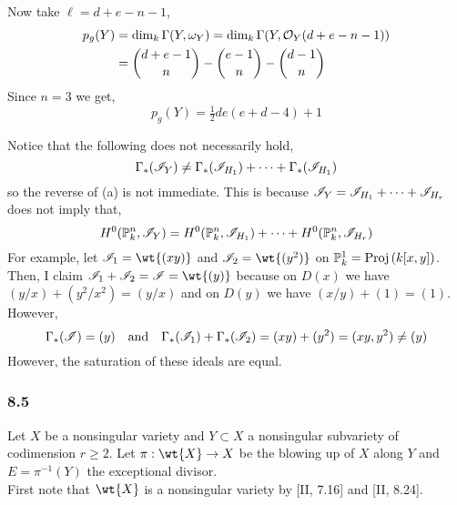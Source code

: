\documentclass[12pt]{article}
\begin{document}
\begin{enumerate}
\begin{center}
\end{center}
Now take $\ell = d + e - n - 1$,
\begin{align*}
p_g(Y) & = \dim_k \Gamma(Y, \omega_Y) = \dim_k \Gamma(Y, \mathcal{O}_{Y}(d + e - n - 1)) 
\\
& = {d + e - 1 \choose n } - { e - 1 \choose n } - { d - 1 \choose n } 
\end{align*} 
Since $n = 3$ we get,
\[ p_g(Y) = \tfrac{1}{2} de (e + d - 4) + 1 \]
\end{enumerate}

\begin{rmk}
Notice that the following does not necessarily hold,
\[ \Gamma_*(\mathscr{I}_Y) \neq \Gamma_*(\mathscr{I}_{H_1}) + \cdots + \Gamma_*(\mathscr{I}_{H_1}) \]
so the reverse of (a) is not immediate. This is because $\mathscr{I}_Y = \mathscr{I}_{H_1} + \cdots + \mathscr{I}_{H_r}$ does not imply that,
\[ H^0(\mathbb{P}^n_k, \mathscr{I}_Y) = H^0(\mathbb{P}^n_k,\mathscr{I}_{H_1}) + \cdots + H^0(\mathbb{P}^n_k,\mathscr{I}_{H_r}) \]
For example, let $\I_1 = \wt{(xy)}$ and $\I_2 = \wt{(y^2)}$ on $\mathbb{P}^1_k = \mathrm{Proj}\left( k[x,y] \right)$. Then, I claim $\I_1 + \I_2 = \I = \wt{(y)}$ because on $D(x)$ we have $(y/x) + (y^2/x^2) = (y/x)$ and on $D(y)$ we have $(x/y) + (1) = (1)$. However,
\[ \Gamma_*(\mathscr{I}) = (y) \quad \text{and} \quad \Gamma_*(\mathscr{I}_1) + \Gamma_*(\mathscr{I}_2) = (xy) + (y^2) = (xy, y^2) \neq (y) \]
However, the saturation of these ideals are equal.
\end{rmk}

\subsubsection{8.5}

\renewcommand{\Pic}[1]{\mathrm{Pic}(#1)}

Let $X$ be a nonsingular variety and $Y \subset X$ a nonsingular subvariety of codimension $r \ge 2$. Let $\pi : \wt{X} \to X$ be the blowing up of $X$ along $Y$ and $E = \pi^{-1}(Y)$ the exceptional divisor.
\bigskip\\
First note that $\wt{X}$ is a nonsingular variety by [II, 7.16] and [II, 8.24]. 
\end{document}
